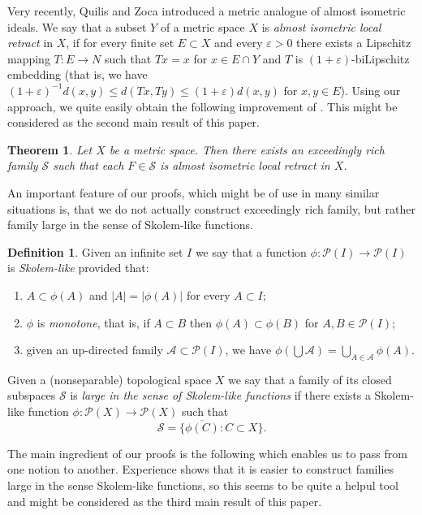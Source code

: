 \documentclass[11pt]{amsart}
\newtheorem{thmx}{Theorem}
\theoremstyle{definition}
\newtheorem{defin}[thm]{Definition}
\theoremstyle{remark}
\newcommand{\A}{\mathcal A}
\newcommand{\PP}{\mathcal P}
\newcommand{\SSS}{\mathcal S}
\begin{document}
Very recently, Quilis and Zoca \cite{QuilisZoca} introduced a metric analogue of almost isometric ideals. We say that a subset $Y$ of a metric space $X$ is \emph{almost isometric local retract} in $X$, if for every finite set $E\subset X$ and every $\varepsilon>0$ there exists a Lipschitz mapping $T:E\to N$ such that $Tx=x$ for $x\in E\cap Y$ and $T$ is $(1+\varepsilon)$-biLipschitz embedding (that is, we have $(1+\varepsilon)^{-1}d(x,y)\leq d(Tx,Ty)\leq (1+\varepsilon)d(x,y)$ for $x,y\in E$). Using our approach, we quite easily obtain the following improvement of \cite[Theorem 5.5]{QuilisZoca}. This might be considered as the second main result of this paper.

\begin{thmx}\label{thm:main2}
Let $X$ be a metric space. Then there exists an exceedingly rich family $\SSS$ such that each $F\in\SSS$ is almost isometric local retract in $X$.
\end{thmx}

An important feature of our proofs, which might be of use in many similar situations is, that we do not actually construct exceedingly rich family, but rather family large in the sense of Skolem-like functions.

\begin{defin}\label{def:SkolemLikeFucntion}Given an infinite set $I$ we say that a function $\phi:\PP(I) \to \PP(I)$ is \emph{Skolem-like} provided that:
\begin{enumerate}[label=\textnormal{(S-\alph*)}]
    \item\label{it:skolemNotIncrease} $A\subset \phi(A)$ and $|A| = |\phi(A)|$ for every $A\subset I$;
    \item\label{it:skolemMonotone} $\phi$ is \emph{monotone}, that is, if $A\subset B$ then $\phi(A) \subset \phi(B)$ for $A,B\in\PP(I)$;
    \item\label{it:skolemUpDirected} given an up-directed family $\A \subset \PP(I)$, we have $\phi(\bigcup \A) = \bigcup_{A\in \A} \phi(A)$.
\end{enumerate}
Given a (nonseparable) topological space $X$ we say that a family of its closed subspaces $\SSS$ is \emph{large in the sense of Skolem-like functions} if there exists a Skolem-like function $\phi:\PP(X) \to \PP(X)$ such that
\[
\SSS = \{\overline{\phi(C)}\colon C\subset X\}.
\]
\end{defin}

The main ingredient of our proofs is the following which enables us to pass from one notion to another. Experience shows that it is easier to construct families large in the sense Skolem-like functions, so this seems to be quite a helpul tool and might be considered as the third main result of this paper.
\end{document}
